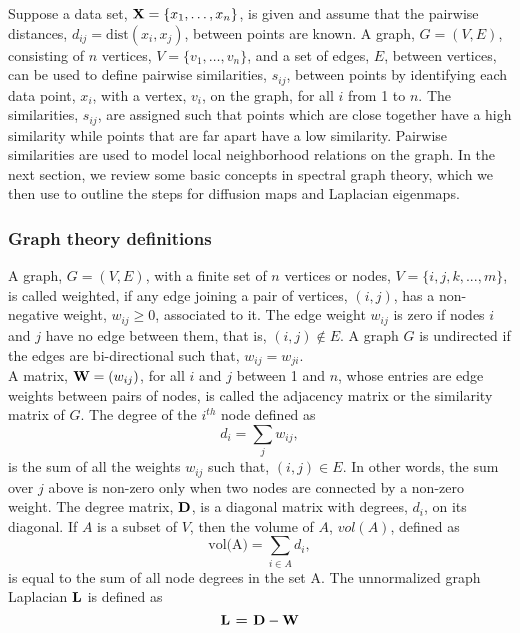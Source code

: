 Suppose a data set, $\textbf{X} =  \{x_{1}, \ldots, x_{n} \}$, is given  and assume that the pairwise distances, $d_{ij} = \text{dist}(x_{i}, x_{j})$, between points are known. A graph, $G = (V,E)$, consisting of $n$ vertices, $V = \{v_{1}, \ldots, v_{n}\}$, and a set of edges, $E$, between vertices, can be used to define pairwise  similarities, $s_{ij}$, between points by identifying each data point, $x_{i}$, with a vertex, $v_{i}$, on the graph, for all $i$ from 1 to $n$.
The similarities, $s_{ij}$, are assigned such that points which are close together have a high similarity while points that are far apart have a low similarity. Pairwise similarities are used to model local neighborhood relations on the graph. In the next section, we review some basic concepts in spectral graph theory, which we then use to outline the steps for diffusion maps and Laplacian eigenmaps.

\subsubsection{Graph theory definitions}
A graph, $G = (V,E)$, with a finite set of $n$ vertices or nodes, $V = \{i, j, k,...,m\}$, is called weighted, if any edge joining a pair of vertices, $(i,j)$, has a non-negative weight, $w_{ij} \geq 0$, associated to it.
The edge weight $w_{ij}$ is zero if nodes $i$ and $j$ have no edge between them, that is, $(i,j) \not \in E.$
A graph $G$ is  undirected if the edges are bi-directional such that, $w_{ij} = w_{ji}$.\\
A matrix, $\textbf{W} = (w_{ij})$, for all $i$ and $j$ between 1 and $n$, 
whose entries are edge weights between pairs of nodes, is called the adjacency matrix or the similarity matrix of $G$. The degree of the $i^{th}$ node defined 
as
\begin{equation}\label{degree}
d_{i} = \sum_{j}w_{ij}, 
\end{equation}
is the sum of all the weights $w_{ij}$ such that, $(i,j) \in E.$ In other words, the sum over $j$ above is non-zero only when two nodes are connected
by a non-zero weight.
The degree matrix, $\textbf{D}$, is a diagonal matrix with degrees, $d_{i}$, on its diagonal.
If $A$ is a subset of $V$, then the volume of $A$, $vol(A)$, defined as 
\[
\text{vol(A)} =  \displaystyle \sum_{i \in A} d_{i},
\]
is equal to the sum of all node degrees in the set A. The unnormalized graph Laplacian $\textbf{L}$ is defined as
\begin{equation}\label{unnormalized Laplacian}
\textbf{L = D} - \textbf{W} 
\end{equation}


